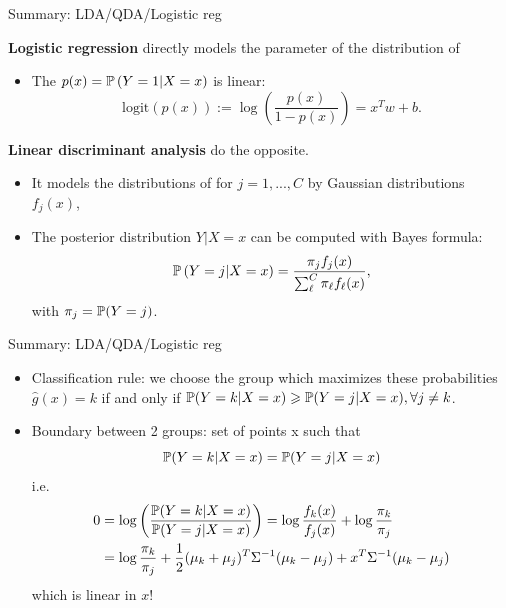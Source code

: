 \documentclass[xcolor={usenames,dvipsnames},handout]{beamer}
\begin{document}
\begin{frame}{Summary: LDA/QDA/Logistic reg}


 \textbf{Logistic regression} directly models the parameter of the distribution of 
 \pause
\begin{itemize}
\item The  $p(x)=\P\left(  Y = 1 | X =x \right)$  is \alert{linear}:
$$
\mathrm{logit} (p(x)) := \log\left( \frac{p(x)}{1-p(x)} \right) = x^T w + b.
$$
\end{itemize}

\textbf{Linear discriminant analysis} do the opposite. 
\pause
\begin{itemize}
\item It models the distributions of  for $j = 1,...,C$ by Gaussian distributions $f_j(x)$,
\item  The posterior distribution $Y|X = x$ can be computed with Bayes formula:
$$
\P \left( Y =j | X=x \right) = \frac{\pi_j f_j(x) }{\sum_\ell^C \pi_\ell f_\ell(x)},
$$
with $\pi_j = \P(Y=j)$.
\end{itemize}

\end{frame}

\begin{frame}{Summary: LDA/QDA/Logistic reg}

\begin{itemize}
\item Classification rule: we choose the group which maximizes these probabilities
$\hat{g}(x)=k$ if and only if $\P(Y=k|X=x)\geq \P(Y=j|X=x), \forall j \neq k$.
\item Boundary between 2 groups: set of points x such that 
$$\P (Y =k|X =x)=\P(Y =j|X =x)$$
i.e.\
\begin{align*}
0 &= \log\left(\frac{\P (Y =k|X =x)}{\P(Y =j|X =x)} \right) =  \log\frac{f_k(x)}{f_j(x)}+ 	\log\frac{\pi_k}{\pi_j} \\
&= \log\frac{\pi_k}{\pi_j} + \frac{1}{2} (\mu_k + \mu_j)^T \Sigma^{-1} (\mu_k - \mu_j) + x^T \Sigma^{-1} (\mu_k - \mu_j)
\end{align*}
which is \alert{linear} in $x$!
\end{itemize}

\end{frame}
\end{document}
